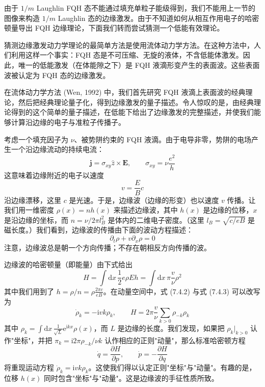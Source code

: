 由于 $1/m$ Laughlin FQH 态不能通过填充单粒子能级得到，我们不能用上一节的图像来构造 $1/m$ Laughlin 态的边缘激发。由于不知道如何从相互作用电子的哈密顿量导出 FQH 边缘理论，下面我们转而尝试猜测一个低能有效理论。

猜测边缘激发动力学理论的最简单方法是使用流体动力学方法。在这种方法中，人们利用这样一个事实：FQH 态是不可压缩、无旋的液体，不含低能体激发。因此，唯一的低能激发（在体能隙之下）是 FQH 液滴形变产生的表面波。这些表面波被认定为 FQH 态的边缘激发。

在流体动力学方法 (Wen, 1992) 中，我们首先研究 FQH 液滴上表面波的经典理论，然后把经典理论量子化，得到边缘激发的量子描述。令人惊叹的是，由经典理论得到的这个简单的量子描述，在低能下给出了边缘激发的完整描述，并使我们能够计算沿边缘的电子与准粒子传播子。

考虑一个填充因子为 $\nu$、被势阱约束的 FQH 液滴。由于电导非零，势阱的电场产生一个沿边缘流动的持续电流：
\begin{equation*}
\pmb{j}=\sigma_{xy}\hat{z}\times\pmb{E},\qquad \sigma_{xy}=\nu\frac{e^{2}}{h}
\end{equation*}
这意味着边缘附近的电子以速度
\begin{equation*}
v=\frac{E}{B}c
\end{equation*}
沿边缘漂移，这里 $c$ 是光速。于是，边缘波（边缘的形变）也以速度 $v$ 传播。让我们用一维密度 $\rho(x)=nh(x)$ 来描述边缘波，其中 $h(x)$ 是边缘的位移，$x$ 是沿边缘的坐标，而 $n=\nu/2\pi l_{B}^{2}$ 是体内的二维电子密度。（这里 $l_{B}=\sqrt{c/eB}$ 是磁长度。）我们看到，边缘波的传播由下面的波动方程描述：
\begin{equation*}
\partial_{t}\rho+v\partial_{x}\rho=0 \tag{7.4.2}
\end{equation*}
注意，边缘波总是朝一个方向传播；不存在朝相反方向传播的波。

边缘波的哈密顿量（即能量）由下式给出
\begin{equation*}
H=\int\mathrm{d}x\,\frac{1}{2}e\rho E h=\int\mathrm{d}x\,\pi\frac{v}{\nu}\rho^{2} \tag{7.4.3}
\end{equation*}
其中我们用到了 $h=\rho/n=\rho\frac{2\pi c}{eB}$。在动量空间中，式 (7.4.2) 与式 (7.4.3) 可以改写为
\begin{equation*}
\dot{\rho}_{k}=-\mathrm{i}vk\rho_{k},\qquad
H=2\pi\frac{v}{\nu}\sum_{k>0}\rho_{-k}\rho_{k} \tag{7.4.4}
\end{equation*}
其中 $\rho_{k}=\int\mathrm{d}x\,\frac{1}{\sqrt{L}}\mathrm{e}^{\mathrm{i}kx}\rho(x)$，而 $L$ 是边缘的长度。我们发现，如果把 $\rho_{k}|_{k>0}$ 认作"坐标"，并把 $\pi_{k}=\mathrm{i}2\pi\rho_{-k}/\nu k$ 认作相应的正则"动量"，那么标准哈密顿方程
\begin{equation*}
\dot{q}=\frac{\partial H}{\partial p},\qquad \dot{p}=-\frac{\partial H}{\partial q}
\end{equation*}
将重现运动方程 $\dot{\rho}_{k}=\mathrm{i}vk\rho_{k}$。这使我们得以认定正则"坐标"与"动量"。有趣的是，位移 $h(x)$ 同时包含"坐标"与"动量"。这是边缘波的手征性质所致。

